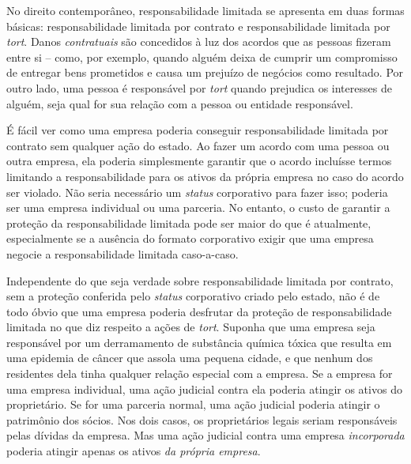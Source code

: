 No direito contemporâneo, responsabilidade limitada se apresenta em duas formas básicas: responsabilidade limitada por contrato e responsabilidade limitada por \emph{tort}. Danos \emph{contratuais} são concedidos à luz dos acordos que as pessoas fizeram entre si -- como, por exemplo, quando alguém deixa de cumprir um compromisso de entregar bens prometidos e causa um prejuízo de negócios como resultado. Por outro lado, uma pessoa é responsável por \emph{tort} quando prejudica os interesses de alguém, seja qual for sua relação com a pessoa ou entidade responsável.

É fácil ver como uma empresa poderia conseguir responsabilidade limitada por contrato sem qualquer ação do estado. Ao fazer um acordo com uma pessoa ou outra empresa, ela poderia simplesmente garantir que o acordo incluísse termos limitando a responsabilidade para os ativos da própria empresa no caso do acordo ser violado. Não seria necessário um \emph{status} corporativo para fazer isso; poderia ser uma empresa individual ou uma parceria. No entanto, o custo de garantir a proteção da responsabilidade limitada pode ser maior do que é atualmente, especialmente se a ausência do formato corporativo exigir que uma empresa negocie a responsabilidade limitada caso-a-caso.

Independente do que seja verdade sobre responsabilidade limitada por contrato, sem a proteção conferida pelo \emph{status} corporativo criado pelo estado, não é de todo óbvio que uma empresa poderia desfrutar da proteção de responsabilidade limitada no que diz respeito a ações de \emph{tort}. Suponha que uma empresa seja responsável por um derramamento de substância química tóxica que resulta em uma epidemia de câncer que assola uma pequena cidade, e que nenhum dos residentes dela tinha qualquer relação especial com a empresa. Se a empresa for uma empresa individual, uma ação judicial contra ela poderia atingir os ativos do proprietário. Se for uma parceria normal, uma ação judicial poderia atingir o patrimônio dos sócios. Nos dois casos, os proprietários legais seriam responsáveis pelas dívidas da empresa. Mas uma ação judicial contra uma empresa \emph{incorporada} poderia atingir apenas os ativos \emph{da própria empresa}.

